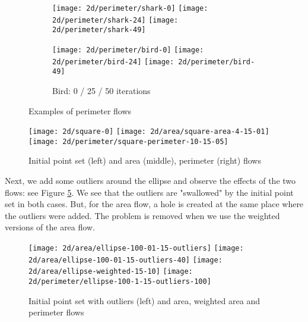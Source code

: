 \begin{figure}[h]
    \centering

    \begin{subfigure}[b]{\textwidth}
        \texttt{[image: 2d/perimeter/shark-0]}
        \texttt{[image: 2d/perimeter/shark-24]}
        \texttt{[image: 2d/perimeter/shark-49]}
        \label{fig:shark_perimeter_flow}
    \end{subfigure}

    \begin{subfigure}[b]{\textwidth}
        \texttt{[image: 2d/perimeter/bird-0]}
        \texttt{[image: 2d/perimeter/bird-24]}
        \texttt{[image: 2d/perimeter/bird-49]}
        \caption{Bird: 0 / 25 / 50 iterations}
        \label{fig:bird_perimeter_flow}
    \end{subfigure}

    \caption{Examples of perimeter flows}
\end{figure}

\begin{figure}[h]
    \centering
    \texttt{[image: 2d/square-0]}
    \texttt{[image: 2d/area/square-area-4-15-01]}
    \texttt{[image: 2d/perimeter/square-perimeter-10-15-05]}
    \caption{Initial point set (left) and area (middle), perimeter (right) flows}
    \label{fig:area_perimeter_flow_square}
\end{figure}

Next, we add some outliers around the ellipse and observe the effects of the two
flows: see Figure \ref{fig:ellipse_outliers_flow}. We see that the outliers
are "swallowed" by the initial point set in both cases. But, for the area flow,
a hole is created at the same place where the outliers were added. The problem
is removed when we use the weighted versions of the area flow.

\begin{figure}[h]
    \centering

    \texttt{[image: 2d/area/ellipse-100-01-15-outliers]}
    \texttt{[image: 2d/area/ellipse-100-01-15-outliers-40]}
    \texttt{[image: 2d/area/ellipse-weighted-15-10]}
    \texttt{[image: 2d/perimeter/ellipse-100-1-15-outliers-100]}
    \caption{Initial point set with outliers (left) and area, weighted area and
        perimeter flows}
    \label{fig:ellipse_outliers_flow}
\end{figure}

